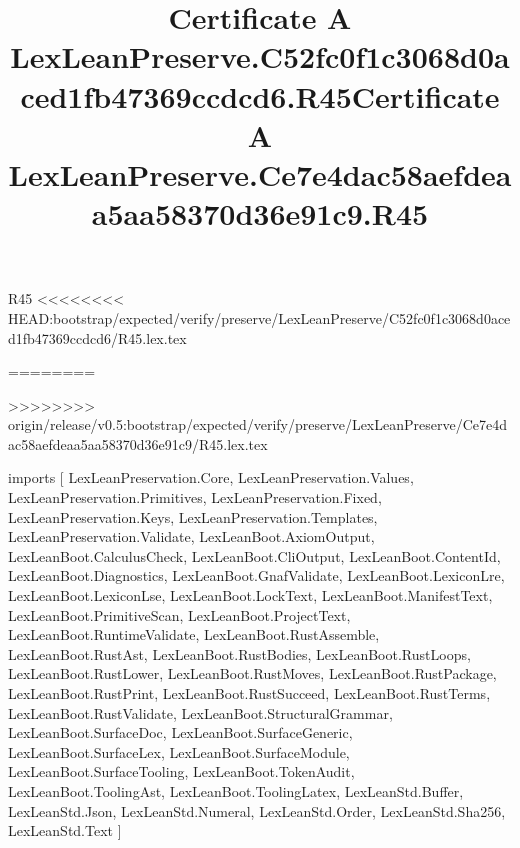 \begin{lexlean}{R45}
<<<<<<<< HEAD:bootstrap/expected/verify/preserve/LexLeanPreserve/C52fc0f1c3068d0aced1fb47369ccdcd6/R45.lex.tex
\title{Certificate A LexLeanPreserve.C52fc0f1c3068d0aced1fb47369ccdcd6.R45}
========
\title{Certificate A LexLeanPreserve.Ce7e4dac58aefdeaa5aa58370d36e91c9.R45}
>>>>>>>> origin/release/v0.5:bootstrap/expected/verify/preserve/LexLeanPreserve/Ce7e4dac58aefdeaa5aa58370d36e91c9/R45.lex.tex
\begin{coremodule}
imports [
  LexLeanPreservation.Core,
  LexLeanPreservation.Values,
  LexLeanPreservation.Primitives,
  LexLeanPreservation.Fixed,
  LexLeanPreservation.Keys,
  LexLeanPreservation.Templates,
  LexLeanPreservation.Validate,
  LexLeanBoot.AxiomOutput,
  LexLeanBoot.CalculusCheck,
  LexLeanBoot.CliOutput,
  LexLeanBoot.ContentId,
  LexLeanBoot.Diagnostics,
  LexLeanBoot.GnafValidate,
  LexLeanBoot.LexiconLre,
  LexLeanBoot.LexiconLse,
  LexLeanBoot.LockText,
  LexLeanBoot.ManifestText,
  LexLeanBoot.PrimitiveScan,
  LexLeanBoot.ProjectText,
  LexLeanBoot.RuntimeValidate,
  LexLeanBoot.RustAssemble,
  LexLeanBoot.RustAst,
  LexLeanBoot.RustBodies,
  LexLeanBoot.RustLoops,
  LexLeanBoot.RustLower,
  LexLeanBoot.RustMoves,
  LexLeanBoot.RustPackage,
  LexLeanBoot.RustPrint,
  LexLeanBoot.RustSucceed,
  LexLeanBoot.RustTerms,
  LexLeanBoot.RustValidate,
  LexLeanBoot.StructuralGrammar,
  LexLeanBoot.SurfaceDoc,
  LexLeanBoot.SurfaceGeneric,
  LexLeanBoot.SurfaceLex,
  LexLeanBoot.SurfaceModule,
  LexLeanBoot.SurfaceTooling,
  LexLeanBoot.TokenAudit,
  LexLeanBoot.ToolingAst,
  LexLeanBoot.ToolingLatex,
  LexLeanStd.Buffer,
  LexLeanStd.Json,
  LexLeanStd.Numeral,
  LexLeanStd.Order,
  LexLeanStd.Sha256,
  LexLeanStd.Text
]


\end{coremodule}
\end{lexlean}
